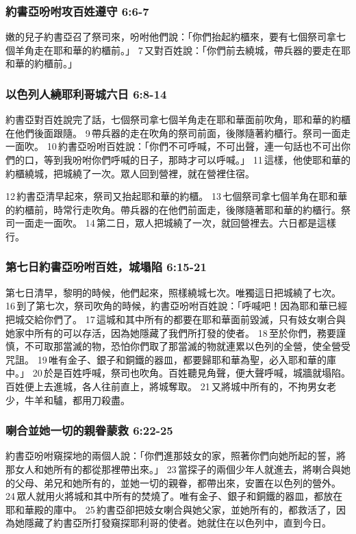 \subsubsection{約書亞吩咐攻百姓遵守 6:6-7}
嫩的兒子約書亞召了祭司來，吩咐他們說：「你們抬起約櫃來，要有七個祭司拿七個羊角走在耶和華的約櫃前。」 7 又對百姓說：「你們前去繞城，帶兵器的要走在耶和華的約櫃前。」

\subsubsection{以色列人繞耶利哥城六日 6:8-14}
約書亞對百姓說完了話，七個祭司拿七個羊角走在耶和華面前吹角，耶和華的約櫃在他們後面跟隨。 9 帶兵器的走在吹角的祭司前面，後隊隨著約櫃行。祭司一面走一面吹。 10 約書亞吩咐百姓說：「你們不可呼喊，不可出聲，連一句話也不可出你們的口，等到我吩咐你們呼喊的日子，那時才可以呼喊。」 11 這樣，他使耶和華的約櫃繞城，把城繞了一次。眾人回到營裡，就在營裡住宿。

12 約書亞清早起來，祭司又抬起耶和華的約櫃。 13 七個祭司拿七個羊角在耶和華的約櫃前，時常行走吹角。帶兵器的在他們前面走，後隊隨著耶和華的約櫃行。祭司一面走一面吹。 14 第二日，眾人把城繞了一次，就回營裡去。六日都是這樣行。

\subsubsection{第七日約書亞吩咐百姓，城塌陷 6:15-21}
第七日清早，黎明的時候，他們起來，照樣繞城七次。唯獨這日把城繞了七次。 16 到了第七次，祭司吹角的時候，約書亞吩咐百姓說：「呼喊吧！因為耶和華已經把城交給你們了。 17 這城和其中所有的都要在耶和華面前毀滅，只有妓女喇合與她家中所有的可以存活，因為她隱藏了我們所打發的使者。 18 至於你們，務要謹慎，不可取那當滅的物，恐怕你們取了那當滅的物就連累以色列的全營，使全營受咒詛。 19 唯有金子、銀子和銅鐵的器皿，都要歸耶和華為聖，必入耶和華的庫中。」 20 於是百姓呼喊，祭司也吹角。百姓聽見角聲，便大聲呼喊，城牆就塌陷。百姓便上去進城，各人往前直上，將城奪取。 21 又將城中所有的，不拘男女老少，牛羊和驢，都用刀殺盡。

\subsubsection{喇合並她一切的親眷蒙救 6:22-25}
約書亞吩咐窺探地的兩個人說：「你們進那妓女的家，照著你們向她所起的誓，將那女人和她所有的都從那裡帶出來。」 23 當探子的兩個少年人就進去，將喇合與她的父母、弟兄和她所有的，並她一切的親眷，都帶出來，安置在以色列的營外。 24 眾人就用火將城和其中所有的焚燒了。唯有金子、銀子和銅鐵的器皿，都放在耶和華殿的庫中。 25 約書亞卻把妓女喇合與她父家，並她所有的，都救活了，因為她隱藏了約書亞所打發窺探耶利哥的使者。她就住在以色列中，直到今日。


